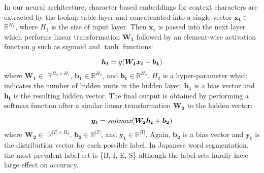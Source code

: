 \documentclass[11pt,letterpaper]{article}
\begin{document}

In our neural architecture, character based embeddings for context characters are extracted by the lookup table layer and concatenated into a single vector $\bm{x_t}$$\in$ $\mathbb{R}^{H_{1}}$, where $H_{1}$ is the size of input layer. 
Then $\bm{x_{t}}$ is passed into the next layer which performs linear transformation $\bm{W_{1}}$  followed by an element-wise activation function $g$ such as sigmoid and $\tanh$ functions:


\begin{equation}
\label{ffnn_h}
 \bm{h_{t}} = g(\bm{W_{1}}\bm{x_{t}} + \bm{b_{1}})
 \vspace{6pt}
\end{equation}
where $\bm{W_1}$$\in$ $\mathbb{R}^{H_{2} \times H_{1}}$, $\bm{b_{1}}\in\mathbb{R}^{H_{2}}$, and $\bm{h_{t}}\in\mathbb{R}^{H_{2}}$. 
$H_{2}$ is a hyper-parameter which indicates the number of hidden units in the hidden layer, $\bm{b_{1}}$ is a bias vector and $\bm{h_{t}}$ is the resulting hidden vector. The final output is obtained by performing a softmax function after a similar linear transformation $\bm{W_2}$ to the hidden vector:

\begin{equation}
 \bm{y_{t}} = \mathit{softmax}(\bm{W_{2}}\bm{h_{t}} + \bm{b_{2}})
 \vspace{6pt}
\end{equation}
where $\bm{W_2}$$\in$ $\mathbb{R}^{|T| \times H_{2}}$, $\bm{b_{2}}\in\mathbb{R}^{|T|}$, and $\bm{y_{t}}\in\mathbb{R}^{|T|}$. Again, $\bm{b_{2}}$ is a bias vector and $\bm{y_t}$  is the distribution vector for each possible label. In Japanese word segmentation, the most prevalent label set is \{B, I, E, S\} although the label sets hardly have large effect on accuracy.
\end{document}
